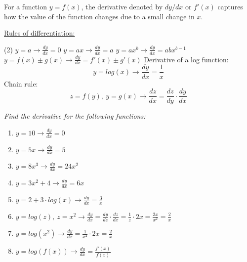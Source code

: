 \documentclass{./../../Latex/handout}
\begin{document}
\thispagestyle{plain}
\vspace{-1em}

For a function $ y = f(x) $, the derivative denoted by $dy/dx$ or $f'(x)$ captures how the value of the function changes due to a small change in $x$.

\underline{Rules of differentiation:}
\begin{tasks}(2)
\task $\displaystyle y=a  \rightarrow  \frac{dy}{dx}=0$
\task $\displaystyle y=ax \rightarrow \frac{dy}{dx}=a$
\task $\displaystyle y=ax^b \rightarrow  \frac{dy}{dx}=abx^{b-1}$
\task $\displaystyle y=f(x) \pm g(x) \rightarrow  \frac{dy}{dx}=f'(x) \pm g'(x)$ 
\task Derivative of a log function:
$$ y=log(x)  \rightarrow  \frac{dy}{dx}=\dfrac{1}{x}$$
\task Chain rule:
$$z=f(y),\ y=g(x) \rightarrow  \frac{d z}{d x}=\dfrac{d z}{d y} \cdot \frac{d y}{d x}$$
\end{tasks}
\vspace{-2em}

\textit{Find the derivative for the following functions:}
\begin{enumerate}
	\item $ \displaystyle y = 10 \rightarrow  \frac{dy}{dx}=0$
	\item $ \displaystyle y = 5x \rightarrow  \frac{dy}{dx}=5$
	\item $ \displaystyle y = 8x^3 \rightarrow  \frac{dy}{dx}=24x^2$
	\item $ \displaystyle y = 3x^2 + 4 \rightarrow  \frac{dy}{dx}= 6x$
	\item $ \displaystyle y = 2 + 3 \cdot log(x)\rightarrow  \frac{dy}{dx}= \frac{3}{x} $
	\item $ \displaystyle y = log(z),\ z = x^2 \rightarrow  \frac{dy}{dx}= \frac{dy}{dz} \cdot \frac{dz}{dx} = \frac{1}{z}\cdot 2x = \frac{2x}{x^2} = \frac{2}{x}$
	\item $ \displaystyle y = log(x^2) \rightarrow  \frac{dy}{dx}= \frac{1}{x^2}\cdot 2x = \frac{2}{x}$
	\item $ \displaystyle y = log(f(x)) \rightarrow  \frac{dy}{dx}= \frac{f'(x)}{f(x)}$
\end{enumerate}
\end{document}
